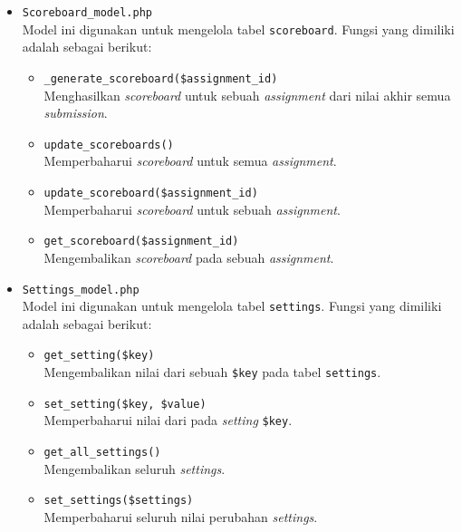 \documentclass[a4paper,twoside]{article}
\begin{document}
\begin{enumerate}
\begin{itemize}
\begin{itemize}
			            \item \verb|Scoreboard_model.php| \\
			                  Model ini digunakan untuk mengelola tabel \verb|scoreboard|. Fungsi yang dimiliki adalah sebagai berikut:

			                  \begin{itemize}
				                  \item \verb|_generate_scoreboard($assignment_id)| \\
				                        Menghasilkan \textit{scoreboard} untuk sebuah \textit{assignment} dari nilai akhir semua \textit{submission}.
				                  \item \verb|update_scoreboards()| \\
				                        Memperbaharui \textit{scoreboard} untuk semua \textit{assignment}.
				                  \item \verb|update_scoreboard($assignment_id)| \\
				                        Memperbaharui \textit{scoreboard} untuk sebuah \textit{assignment}.
				                  \item \verb|get_scoreboard($assignment_id)| \\
				                        Mengembalikan \textit{scoreboard} pada sebuah \textit{assignment}.
			                  \end{itemize}

			            \item \verb|Settings_model.php| \\
			                  Model ini digunakan untuk mengelola tabel \verb|settings|. Fungsi yang dimiliki adalah sebagai berikut:

			                  \begin{itemize}
				                  \item \verb|get_setting($key)| \\
				                        Mengembalikan nilai dari sebuah \verb|$key| pada tabel \verb|settings|.
				                  \item \verb|set_setting($key, $value)| \\
				                        Memperbaharui nilai dari pada \textit{setting} \verb|$key|.
				                  \item \verb|get_all_settings()| \\
				                        Mengembalikan seluruh \textit{settings}.
				                  \item \verb|set_settings($settings)| \\
				                        Memperbaharui seluruh nilai perubahan \textit{settings}.
			                  \end{itemize}


\end{itemize}
\end{itemize}
\end{enumerate}
\end{document}
